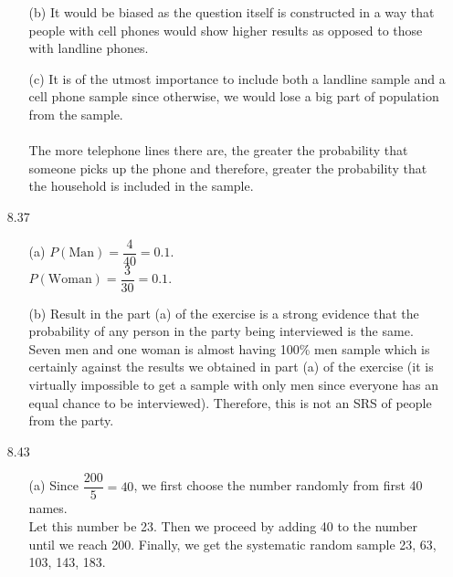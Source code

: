 \documentclass[11pt, a4paper]{article}
\begin{document}
\begin{itemize}
\begin{itemize}
\item[]

\item[(b)]
It would be biased as the question itself is constructed in a way
that people with cell phones would show higher results as opposed to
those with landline phones.

\item[]

\item[(c)]
It is of the utmost importance to include both a landline sample and
a cell phone sample since otherwise, we would lose a big part of population
from the sample.\\\\
The more telephone lines there are, the greater the probability that someone picks
up the phone and therefore, greater the probability that the household is included in the sample.
\end{itemize}

\item[]
\item[]

\item[8.37]
\begin{itemize}
\item[(a)]
$P(\text{Man}) = \dfrac{4}{40} = 0.1$.\\
$P(\text{Woman}) = \dfrac{3}{30} = 0.1$.\\

\item[]

\item[(b)]
Result in the part (a) of the exercise is a strong evidence that the probability
of any person in the party being interviewed is the same. Seven men and one woman
is almost having 100\% men sample which is certainly against the results we obtained
in part (a) of the exercise (it is virtually impossible to get a sample with only men
since everyone has an equal chance to be interviewed). Therefore, this is not an SRS
of people from the party.
\end{itemize}

\item[]
\item[]

\item[8.43]
\begin{itemize}
\item[(a)]
Since $\dfrac{200}{5} = 40$, we first choose the number randomly from first 40 names.
\vspace{0.02cm}\\
Let this number be 23. Then we proceed by adding
40 to the number until we reach 200. Finally, we get the systematic
random sample 23, 63, 103, 143, 183.


\end{itemize}
\end{itemize}
\end{document}
